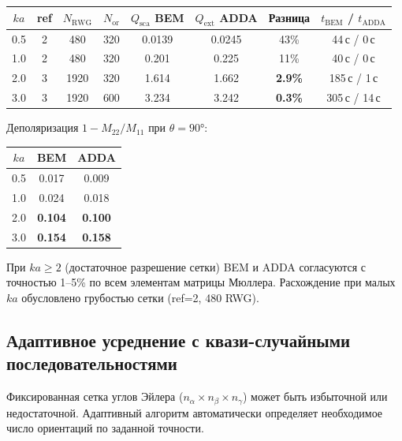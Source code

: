 \documentclass[12pt,a4paper]{article}
\begin{document}
\begin{center}
\begin{tabular}{cccccccc}
\toprule
$ka$ & ref & $N_{\mathrm{RWG}}$ & $N_{\mathrm{or}}$ & $Q_{\mathrm{sca}}$ BEM & $Q_{\mathrm{ext}}$ ADDA & Разница & $t_{\mathrm{BEM}}$ / $t_{\mathrm{ADDA}}$ \\
\midrule
0.5 & 2 & 480  & 320 & 0.0139 & 0.0245 & 43\% & 44\,с / 0\,с \\
1.0 & 2 & 480  & 320 & 0.201  & 0.225  & 11\% & 40\,с / 0\,с \\
2.0 & 3 & 1920 & 320 & 1.614  & 1.662  & \textbf{2.9\%} & 185\,с / 1\,с \\
3.0 & 3 & 1920 & 600 & 3.234  & 3.242  & \textbf{0.3\%} & 305\,с / 14\,с \\
\bottomrule
\end{tabular}
\end{center}

Деполяризация $1 - M_{22}/M_{11}$ при $\theta = 90°$:

\begin{center}
\begin{tabular}{ccc}
\toprule
$ka$ & BEM & ADDA \\
\midrule
0.5 & 0.017 & 0.009 \\
1.0 & 0.024 & 0.018 \\
2.0 & \textbf{0.104} & \textbf{0.100} \\
3.0 & \textbf{0.154} & \textbf{0.158} \\
\bottomrule
\end{tabular}
\end{center}

При $ka \geq 2$ (достаточное разрешение сетки) BEM и ADDA согласуются с точностью 1--5\% по всем элементам матрицы Мюллера. Расхождение при малых $ka$ обусловлено грубостью сетки (ref=2, 480 RWG).


\subsection{Адаптивное усреднение с квази-случайными последовательностями}

Фиксированная сетка углов Эйлера ($n_\alpha \times n_\beta \times n_\gamma$) может быть
избыточной или недостаточной. Адаптивный алгоритм автоматически определяет необходимое
число ориентаций по заданной точности.
\end{document}
